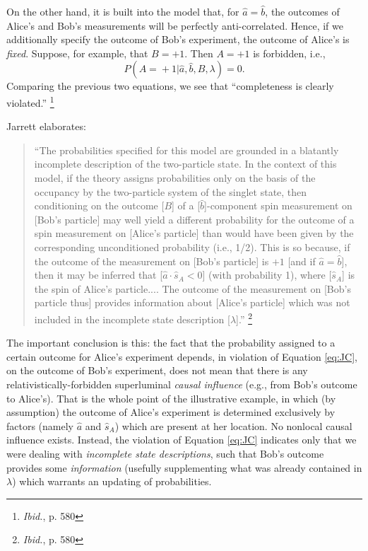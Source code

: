 \documentclass[aps,prc,twocolumn]{revtex4}
\begin{document}
On the other hand, it is built into the model that, for $\hat{a} =
\hat{b}$, the outcomes of Alice's and Bob's measurements will be
perfectly anti-correlated.  Hence, if we additionally specify the
outcome of Bob's experiment, the outcome of Alice's is \emph{fixed}.
Suppose, for example, that $B = +1$.  Then $A = +1$ is forbidden,
i.e., 
\begin{equation}
P (A \! = \! +1  | \hat{a}, \hat{b}, B, \lambda) = 0. 
\label{eq:comp2}
\end{equation}
Comparing the previous two equations, we see that ``completeness is
clearly violated.''  \footnote{\emph{Ibid.}, p. 580}


Jarrett elaborates: 
\begin{quote}
``The probabilities specified for this model are
grounded in a blatantly incomplete description of the two-particle
state.  In the context of this model, if the theory assigns
probabilities only on the basis of the occupancy by the two-particle 
system of the singlet state, then conditioning on the outcome [$B$] of a
[$\hat{b}$]-component spin measurement on [Bob's particle] may well
yield a different probability for the outcome of a spin measurement on
[Alice's particle] than would have been given by the corresponding
unconditioned probability (i.e., 1/2).  This is so because, if the
outcome of the measurement on [Bob's particle] is $+1$ [and if
$\hat{a} = \hat{b}$], then it may be
inferred that [$\hat{a} \cdot \hat{s}_A < 0 $] (with probability 1),
where [$\hat{s}_A$] is the spin of Alice's particle....
The outcome of the measurement on [Bob's particle thus] provides
information about [Alice's particle] which was not included in the
incomplete state description [$\lambda$].''  \footnote{\emph{Ibid.},
  p. 580}
\end{quote}
The important conclusion is this:
the fact that the probability assigned to a certain outcome
for Alice's experiment 
depends, in violation of Equation \ref{eq:JC}, on the
outcome of Bob's experiment, does not mean that there is any
relativistically-forbidden superluminal \emph{causal influence} (e.g.,
from Bob's outcome to Alice's).  
That is the whole point of the illustrative example, in
which (by assumption) the outcome of Alice's experiment is determined
exclusively by factors (namely $\hat{a}$ and $\hat{s}_A$) which are
present at her location.  No nonlocal causal influence exists.  
Instead, the violation of Equation \ref{eq:JC} indicates only that we
were dealing with \emph{incomplete state descriptions}, such that
Bob's outcome provides some \emph{information} (usefully supplementing
what was already contained in $\lambda$) which warrants an updating of
probabilities.  
\end{document}
